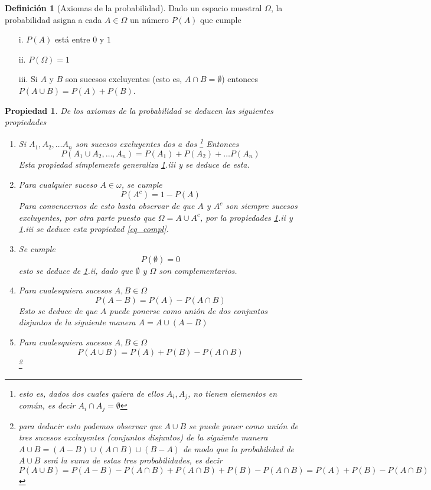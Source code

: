 \documentclass[]{book}
\theoremstyle{plain}
\newtheorem{property}[theorem]{Propiedad}
\theoremstyle{definition}
\newtheorem{definition}[theorem]{Definición}
\theoremstyle{definition} %
\begin{document}
\begin{definition}[Axiomas de la probabilidad]\label{def_axiom}
Dado un espacio muestral $\Omega$, la probabilidad asigna a cada $A\in \Omega$ un número
$P(A)$ que cumple
\begin{enumerate}
  \item[i.] $P(A)$ está entre $0$ y $1$
  \item[ii.] $P(\Omega) = 1$
  \item[iii.] Si $A$ y $B$ son sucesos excluyentes (esto es, $A\cap B = \emptyset$) entonces $P(A\cup B) = P(A) + P(B)$.
\end{enumerate}
\end{definition}

\begin{property}\label{prop_3}
  De los axiomas de la probabilidad se deducen las siguientes propiedades
\begin{enumerate}[(1)]
  \item Si $A_1, A_2, \ldots A_n$ son sucesos excluyentes dos a dos \footnote{esto es, dados dos cuales quiera de ellos $A_i, A_j$, no tienen elementos en común, es decir $A_i\cap A_j = \emptyset$}
  Entonces $$P(A_1 \cup A_2, \ldots, A_n)=P(A_1) + P(A_2) + \ldots P(A_n)$$
  Esta propiedad símplemente generaliza \ref{def_axiom}.iii y se deduce de esta.
  \item Para cualquier suceso $A\in \omega$, se cumple
  \begin{equation}\label{eq_compl}
    P(A^c) = 1-P(A)
  \end{equation}
  Para convencernos de esto basta observar de que $A$ y $A^c$ son siempre sucesos excluyentes, 
  por otra parte puesto que $\Omega = A \cup A^c$, por la propiedades \ref{def_axiom}.ii y \ref{def_axiom}.iii se deduce esta propiedad \ref{eq_compl}. 
  \item Se cumple
  \[P(\emptyset) = 0 \]
  esto se deduce de \ref{def_axiom}.ii, dado que $\emptyset$ y $\Omega$ son complementarios.
  \item Para cualesquiera sucesos $A,B\in \Omega$
  \[P(A-B)= P(A) - P(A\cap B)\]
  Esto se deduce de que $A$ puede ponerse como unión de dos conjuntos disjuntos de la siguiente manera $A = A \cup (A-B)$
  \item Para cualesquiera sucesos $A,B\in \Omega$
  \[P(A\cup B) = P(A) + P(B) - P(A\cap B)\]
  \footnote{para deducir esto podemos observar que $A\cup B $ se puede poner como unión de tres sucesos excluyentes (conjuntos disjuntos) de la siguiente manera 
   $A\cup B = (A-B) \cup (A\cap B) \cup (B-A)$ de modo que la probabilidad de $A\cup B$ será la suma de estas tres probabilidades, es decir 
   \[P(A\cup B) = P(A-B) - P(A\cap B) + P(A\cap B) + P(B) - P(A\cap B) = P(A) + P(B) - P(A\cap B) \]}
\end{enumerate}
\end{property}
\end{document}
